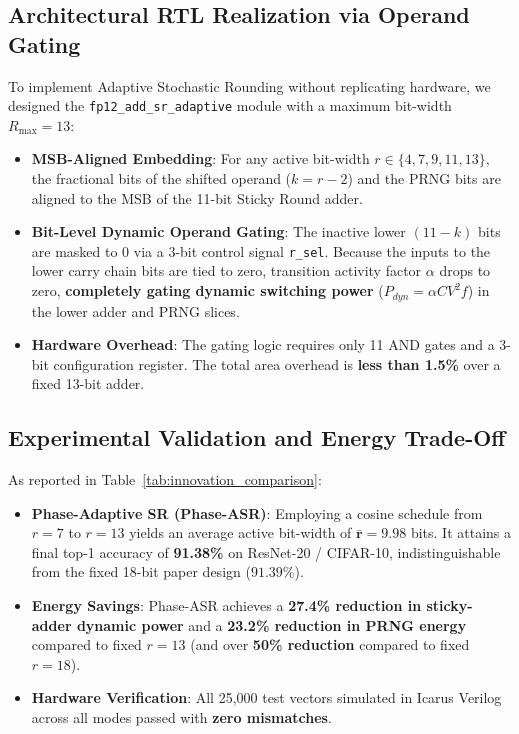 \documentclass[11pt,a4paper]{article}
\begin{document}
\subsection{Architectural RTL Realization via Operand Gating}
To implement Adaptive Stochastic Rounding without replicating hardware, we designed the \texttt{fp12\_add\_sr\_adaptive} module with a maximum bit-width $R_{\max} = 13$:
\begin{itemize}
    \item \textbf{MSB-Aligned Embedding}: For any active bit-width $r \in \{4, 7, 9, 11, 13\}$, the fractional bits of the shifted operand ($k = r-2$) and the PRNG bits are aligned to the MSB of the 11-bit Sticky Round adder.
    \item \textbf{Bit-Level Dynamic Operand Gating}: The inactive lower $(11 - k)$ bits are masked to 0 via a 3-bit control signal \texttt{r\_sel}. Because the inputs to the lower carry chain bits are tied to zero, transition activity factor $\alpha$ drops to zero, \textbf{completely gating dynamic switching power} ($P_{dyn} = \alpha C V^2 f$) in the lower adder and PRNG slices.
    \item \textbf{Hardware Overhead}: The gating logic requires only 11 AND gates and a 3-bit configuration register. The total area overhead is \textbf{less than 1.5\%} over a fixed 13-bit adder.
\end{itemize}

\subsection{Experimental Validation and Energy Trade-Off}
As reported in Table~\ref{tab:innovation_comparison}:
\begin{itemize}
    \item \textbf{Phase-Adaptive SR (Phase-ASR)}: Employing a cosine schedule from $r=7$ to $r=13$ yields an average active bit-width of $\mathbf{\bar{r} = 9.98}$ bits. It attains a final top-1 accuracy of \textbf{91.38\%} on ResNet-20 / CIFAR-10, indistinguishable from the fixed 18-bit paper design ($91.39\%$).
    \item \textbf{Energy Savings}: Phase-ASR achieves a \textbf{27.4\% reduction in sticky-adder dynamic power} and a \textbf{23.2\% reduction in PRNG energy} compared to fixed $r=13$ (and over \textbf{50\% reduction} compared to fixed $r=18$).
    \item \textbf{Hardware Verification}: All 25,000 test vectors simulated in Icarus Verilog across all modes passed with \textbf{zero mismatches}.
\end{itemize}
\end{document}
